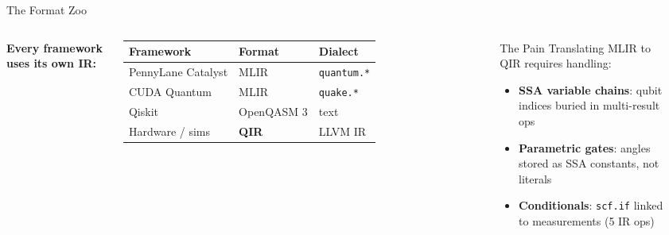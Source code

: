 \documentclass[aspectratio=169,10pt]{beamer}
\newcommand{\hlg}[1]{\textcolor{qirgreen}{\textbf{#1}}}
\newcommand{\hlo}[1]{\textcolor{ssaorange}{\textbf{#1}}}
\begin{document}
\begin{frame}[t]{The Format Zoo}
  \begin{columns}[T]
      \textbf{Every framework uses its own IR:}
      \vspace{4pt}
      \begin{tabular}{@{}lll@{}}
        \toprule
        Framework & Format & Dialect \\
        \midrule
        PennyLane Catalyst & MLIR & \texttt{quantum.*} \\
        CUDA Quantum & MLIR & \texttt{quake.*} \\
        Qiskit & OpenQASM 3 & text \\
        Hardware / sims & \hlg{QIR} & LLVM IR \\
        \bottomrule
      \end{tabular}
      \vspace{8pt}
      \begin{alertblock}{The Pain}
        \scriptsize
        Translating MLIR to QIR requires handling:
        \begin{itemize}
          \item \hlo{SSA variable chains}: qubit indices buried in multi-result ops
          \item \hlo{Parametric gates}: angles stored as SSA constants, not literals
          \item \hlo{Conditionals}: \texttt{scf.if} linked to measurements (5 IR ops)
        \end{itemize}
      \end{alertblock}
      \begin{center}
\end{center}
\end{columns}
\end{frame}
\end{document}
